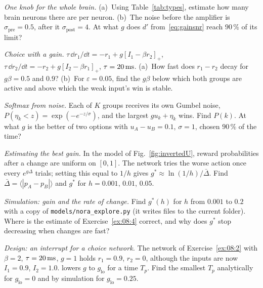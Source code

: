 \begin{exercise}[\lvlA]
\label{ex:08:1}
\emph{One knob for the whole brain.} (a)~Using Table~\ref{tab:types}, estimate how many brain neurons there are per  neuron. (b)~The noise before the amplifier is $\sigma_{\text{pre}}=0.5$, after it $\sigma_{\text{post}}=4$. At what $g$ does $d'$ from~\eqref{eq:gainsnr} reach $90\,\%$ of its limit?
\end{exercise}

\begin{exercise}[\lvlB]
\label{ex:08:2}
\emph{Choice with a gain.} $\tau\,\dd r_1/\dd t=-r_1+g[I_1-\beta r_2]_+$, $\tau\,\dd r_2/\dd t=-r_2+g[I_2-\beta r_1]_+$, $\tau=20\,\text{ms}$. (a)~How fast does $r_1-r_2$ decay for $g\beta=0.5$ and $0.9$? (b)~For $\varepsilon=0.05$, find the $g\beta$ below which both groups are active and above which the weak input's win is stable.
\end{exercise}

\begin{exercise}[\lvlA]
\label{ex:08:3}
\emph{Softmax from noise.} Each of $K$ groups receives its own Gumbel noise, $P(\eta_k<z)=\exp(-e^{-z/\sigma})$, and the largest $gu_k+\eta_k$ wins. Find $P(k)$. At what $g$ is the better of two options with $u_A-u_B=0.1$, $\sigma=1$, chosen $90\,\%$ of the time?
\end{exercise}

\begin{exercise}[\lvlB]
\label{ex:08:4}
\emph{Estimating the best gain.} In the model of Fig.~\ref{fig:invertedU}, reward probabilities after a change are uniform on $[0,1]$. The network tries the worse action once every $e^{g\Delta}$ trials; setting this equal to $1/h$ gives $g^*\approx\ln(1/h)/\bar\Delta$. Find $\bar\Delta=\langle|p_A-p_B|\rangle$ and $g^*$ for $h=0.001$, $0.01$, $0.05$.
\end{exercise}

\begin{exercise}[\lvlB]
\label{ex:08:5}
\emph{Simulation: gain and the rate of change.} Find $g^*(h)$ for $h$ from $0.001$ to $0.2$ with a copy of \texttt{models/\allowbreak nora\_explore.py} (it writes files to the current folder). Where is the estimate of Exercise~\ref{ex:08:4} correct, and why does $g^*$ stop decreasing when changes are fast?
\end{exercise}

\begin{exercise}[\lvlB]
\label{ex:08:6}
\emph{Design: an interrupt for a choice network.} The network of Exercise~\ref{ex:08:2} with $\beta=2$, $\tau=20\,\text{ms}$, $g=1$ holds $r_1=0.9$, $r_2=0$, although the inputs are now $I_1=0.9$, $I_2=1.0$.  lowers $g$ to $g_{\text{lo}}$ for a time $T_p$. Find the smallest $T_p$ analytically for $g_{\text{lo}}=0$ and by simulation for $g_{\text{lo}}=0.25$.
\end{exercise}

